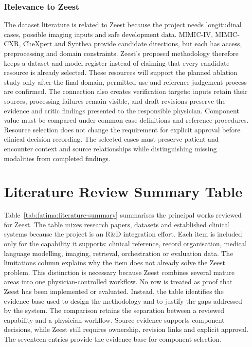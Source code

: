 \subsubsection{Relevance to Zeest}

The dataset literature is related to Zeest because the project needs longitudinal cases, possible imaging inputs and safe development data. MIMIC-IV, MIMIC-CXR, CheXpert and Synthea provide candidate directions, but each has access, preprocessing and domain constraints. Zeest's proposed methodology therefore keeps a dataset and model register instead of claiming that every candidate resource is already selected. These resources will support the planned ablation study only after the final domain, permitted use and reference judgement process are confirmed. The connection also creates verification targets: inputs retain their sources, processing failures remain visible, and draft revisions preserve the evidence and critic findings presented to the responsible physician. Component value must be compared under common case definitions and reference procedures. Resource selection does not change the requirement for explicit approval before clinical decision recording. The selected cases must preserve patient and encounter context and source relationships while distinguishing missing modalities from completed findings.

\section{Literature Review Summary Table}

Table~\ref{tab:fatima:literature-summary} summarises the principal works reviewed for Zeest. The table mixes research papers, datasets and established clinical systems because the project is an R\&D integration effort. Each item is included only for the capability it supports: clinical reference, record organisation, medical language modelling, imaging, retrieval, orchestration or evaluation data. The limitations column explains why the item does not already solve the Zeest problem. This distinction is necessary because Zeest combines several mature areas into one physician-controlled workflow. No row is treated as proof that Zeest has been implemented or evaluated. Instead, the table identifies the evidence base used to design the methodology and to justify the gaps addressed by the system. The comparison retains the separation between a reviewed capability and a physician workflow. Source evidence supports component decisions, while Zeest still requires ownership, revision links and explicit approval. The seventeen entries provide the evidence base for component selection.

